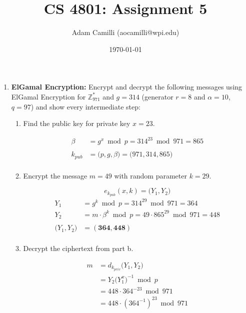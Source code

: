 \documentclass[12pt]{article}
\newenvironment{answer}
{ \begin{tcolorbox}[halign=left]
    }
    {  
  \end{tcolorbox}
}
\begin{document}
\title{CS 4801: Assignment 5}
\author{Adam Camilli (aocamilli@wpi.edu)}
\date{\today}
\maketitle

\begin{enumerate}
  
\item \textbf{ElGamal Encryption:} Encrypt and decrypt the following messages using ElGamal Encryption for $\mathbb{Z}^*_{971}$ and $g = 314$ (generator  $r = 8$ and $\alpha = 10$, $q = 97$) and show every intermediate step:
  \begin{enumerate}
  \item Find the public key for private key $x = 23$. 
    \begin{answer}
      \begin{align*}
        \beta &= g^x \bmod p = 314^{23} \bmod 971 = 865 \\
        & \\
        k_{pub} &= \big( p, g, \beta \big) = \big( 971, 314, 865 \big) \\
      \end{align*}
    \end{answer}
  \item Encrypt the message $m = 49$ with random parameter $k = 29$.  
    \begin{answer}
      \[ e_{k_{pub}}(x,k) = \big(Y_1,Y_2\big) \]
      \begin{align*}        
        Y_1 &= g^k \bmod p = 314^{29} \bmod 971 = 364 \\
        Y_2 &= m \cdot \beta^k \bmod p = 49 \cdot 865^{29} \bmod 971 = 448 \\
        & \\
        \big(Y_1, Y_2\big) &= (\bm{364,448}) \\
      \end{align*}
    \end{answer}
  \item Decrypt the ciphertext from part b. 
    \begin{answer}
      \begin{align*}
        m &= d_{k_{priv}}\big(Y_1,Y_2\big) \\
          &= Y_2\big(Y^x_1\big)^{-1} \bmod p \\
          &= 448 \cdot 364^{-23} \bmod 971 \\        
          &= 448 \cdot (364^{-1})^{23} \bmod 971 \\

\end{align*}
\end{answer}
\end{enumerate}
\end{enumerate}
\end{document}
